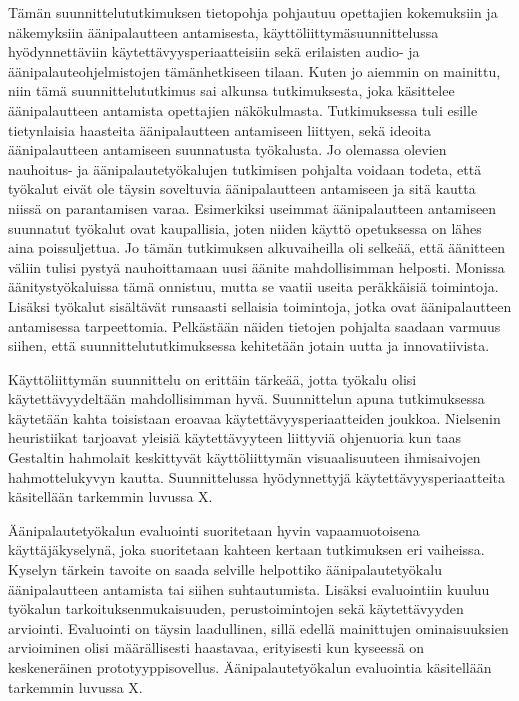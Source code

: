 \documentclass[utf8]{gradu3}
\begin{document}
Tämän suunnittelututkimuksen tietopohja pohjautuu opettajien kokemuksiin ja näkemyksiin äänipalautteen antamisesta, käyttöliittymäsuunnittelussa hyödynnettäviin käytettävyysperiaatteisiin sekä erilaisten audio- ja äänipalauteohjelmistojen tämänhetkiseen tilaan.  Kuten jo aiemmin on mainittu, niin tämä suunnittelututkimus sai alkunsa tutkimuksesta, joka käsittelee äänipalautteen antamista opettajien näkökulmasta. Tutkimuksessa tuli esille tietynlaisia haasteita äänipalautteen antamiseen liittyen, sekä ideoita äänipalautteen antamiseen suunnatusta työkalusta. Jo olemassa olevien nauhoitus- ja äänipalautetyökalujen tutkimisen pohjalta voidaan todeta, että työkalut eivät ole täysin soveltuvia äänipalautteen antamiseen ja sitä kautta niissä on parantamisen varaa. Esimerkiksi useimmat äänipalautteen antamiseen suunnatut työkalut ovat kaupallisia, joten niiden käyttö opetuksessa on lähes aina poissuljettua. Jo tämän tutkimuksen alkuvaiheilla oli selkeää, että äänitteen väliin tulisi pystyä nauhoittamaan uusi äänite mahdollisimman helposti. Monissa äänitystyökaluissa tämä onnistuu, mutta se vaatii useita peräkkäisiä toimintoja. Lisäksi työkalut sisältävät runsaasti sellaisia toimintoja, jotka ovat äänipalautteen antamisessa tarpeettomia. Pelkästään näiden tietojen pohjalta saadaan varmuus siihen, että suunnittelututkimuksessa kehitetään jotain uutta ja innovatiivista.

Käyttöliittymän suunnittelu on erittäin tärkeää, jotta työkalu olisi käytettävyydeltään mahdollisimman hyvä. Suunnittelun apuna tutkimuksessa käytetään kahta toisistaan eroavaa käytettävyysperiaatteiden joukkoa. Nielsenin heuristiikat tarjoavat yleisiä käytettävyyteen liittyviä ohjenuoria kun taas Gestaltin hahmolait keskittyvät käyttöliittymän visuaalisuuteen ihmisaivojen hahmottelukyvyn kautta. Suunnittelussa hyödynnettyjä käytettävyysperiaatteita käsitellään tarkemmin luvussa X.

Äänipalautetyökalun evaluointi suoritetaan hyvin vapaamuotoisena käyttäjäkyselynä, joka suoritetaan kahteen kertaan tutkimuksen eri vaiheissa. Kyselyn tärkein tavoite on saada selville helpottiko äänipalautetyökalu äänipalautteen antamista tai siihen suhtautumista. Lisäksi evaluointiin kuuluu työkalun tarkoituksenmukaisuuden, perustoimintojen sekä käytettävyyden arviointi. Evaluointi on täysin laadullinen, sillä edellä mainittujen ominaisuuksien arvioiminen olisi määrällisesti haastavaa, erityisesti kun kyseessä on keskeneräinen prototyyppisovellus. Äänipalautetyökalun evaluointia käsitellään tarkemmin luvussa X.
\end{document}
